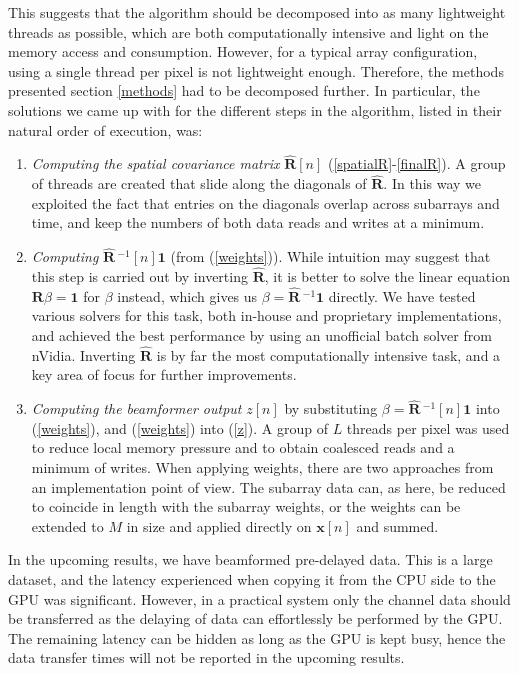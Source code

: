 \documentclass[10pt,a4paper]{article}
\renewcommand\vec[1]{\boldsymbol{#1}}
\newcommand\mat[1]{\boldsymbol{#1}}
\newcommand\1{\vec 1}
\newcommand*\x{\vec x}
\newcommand*\R{\mat R}
\newcommand*\eR{\mat{\hat R}}
\newcommand*\eRi{\hat{\mat R}\,\!^{-1}}
\begin{document}
This suggests that the algorithm should be decomposed into as many lightweight threads as possible, which are both computationally intensive and light on the memory access and consumption. However, for a typical array configuration, using a single thread per pixel is not lightweight enough. Therefore, the methods presented section \ref{methods} had to be decomposed further. In particular, the solutions we came up with for the different steps in the algorithm, listed in their natural order of execution, was:
\begin{enumerate}
\item \emph{Computing the spatial covariance matrix} $\eR[n]$ (\ref{spatialR}-\ref{finalR}). A group of threads are created that slide along the diagonals of $\eR$. In this way we exploited the fact that entries on the diagonals overlap across subarrays and time, and keep the numbers of both data reads and writes at a minimum.
\item \emph{Computing} $\eRi[n]\1$ (from (\ref{weights})). While intuition may suggest that this step is carried out by inverting $\eR$, it is better to solve the linear equation $\R\beta = \1$ for $\beta$ instead, which gives us $\beta = \eRi\1$ directly. We have tested various solvers for this task, both in-house and proprietary implementations, and achieved the best performance by using an unofficial batch solver from nVidia. Inverting $\eR$ is by far the most computationally intensive task, and a key area of focus for further improvements.
\item \emph{Computing the beamformer output} $z[n]$ by substituting $\beta = \eRi[n]\1$ into (\ref{weights}), and (\ref{weights}) into (\ref{z}). A group of $L$ threads per pixel was used to reduce local memory pressure and to obtain coalesced reads and a minimum of writes. When applying weights, there are two approaches from an implementation point of view. The subarray data can, as here, be reduced to coincide in length with the subarray weights, or the weights can be extended to $M$ in size and applied directly on $\x[n]$ and summed.  
\end{enumerate}

In the upcoming results, we have beamformed pre-delayed data. This is a large dataset, and the latency experienced when copying it from the \gls{CPU} side to the \gls{GPU} was significant. However, in a practical system only the channel data should be transferred as the delaying of data can effortlessly be performed by the \gls{GPU}. The remaining latency can be hidden as long as the \gls{GPU} is kept busy, hence the data transfer times will not be reported in the upcoming results.
\end{document}
